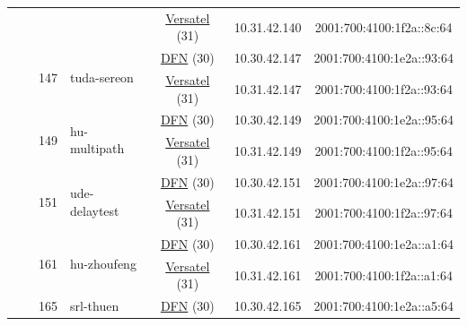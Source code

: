 \begin{small}
\begin{center}
\begin{longtable}{|c|c|c|c|c|c|c|c|}
  &  &  &  & \multicolumn{2}{|c|}{\tiny{\href{http://www.versatel.de}{Versatel} (31)}} & \tiny{10.31.42.140} & \tiny{2001:700:4100:1f2a::8c:64} \\* \cline{3-3}\cline{4-4}\cline{5-5}\cline{6-6}\cline{7-7}\cline{8-8}
  &  & \multirow{2}{*}{\tiny{147}} & \multicolumn{1}{|l|}{\multirow{2}{*}{\tiny{tuda-sereon}}} & \multicolumn{2}{|c|}{\tiny{\href{https://www.dfn.de}{DFN} (30)}} & \tiny{10.30.42.147} & \tiny{2001:700:4100:1e2a::93:64} \\* \cline{5-5}\cline{6-6}\cline{7-7}\cline{8-8}
  &  &  &  & \multicolumn{2}{|c|}{\tiny{\href{http://www.versatel.de}{Versatel} (31)}} & \tiny{10.31.42.147} & \tiny{2001:700:4100:1f2a::93:64} \\* \cline{3-3}\cline{4-4}\cline{5-5}\cline{6-6}\cline{7-7}\cline{8-8}
  &  & \multirow{2}{*}{\tiny{149}} & \multicolumn{1}{|l|}{\multirow{2}{*}{\tiny{hu-multipath}}} & \multicolumn{2}{|c|}{\tiny{\href{https://www.dfn.de}{DFN} (30)}} & \tiny{10.30.42.149} & \tiny{2001:700:4100:1e2a::95:64} \\* \cline{5-5}\cline{6-6}\cline{7-7}\cline{8-8}
  &  &  &  & \multicolumn{2}{|c|}{\tiny{\href{http://www.versatel.de}{Versatel} (31)}} & \tiny{10.31.42.149} & \tiny{2001:700:4100:1f2a::95:64} \\* \cline{3-3}\cline{4-4}\cline{5-5}\cline{6-6}\cline{7-7}\cline{8-8}
  &  & \multirow{2}{*}{\tiny{151}} & \multicolumn{1}{|l|}{\multirow{2}{*}{\tiny{ude-delaytest}}} & \multicolumn{2}{|c|}{\tiny{\href{https://www.dfn.de}{DFN} (30)}} & \tiny{10.30.42.151} & \tiny{2001:700:4100:1e2a::97:64} \\* \cline{5-5}\cline{6-6}\cline{7-7}\cline{8-8}
  &  &  &  & \multicolumn{2}{|c|}{\tiny{\href{http://www.versatel.de}{Versatel} (31)}} & \tiny{10.31.42.151} & \tiny{2001:700:4100:1f2a::97:64} \\* \cline{3-3}\cline{4-4}\cline{5-5}\cline{6-6}\cline{7-7}\cline{8-8}
  &  & \multirow{2}{*}{\tiny{161}} & \multicolumn{1}{|l|}{\multirow{2}{*}{\tiny{hu-zhoufeng}}} & \multicolumn{2}{|c|}{\tiny{\href{https://www.dfn.de}{DFN} (30)}} & \tiny{10.30.42.161} & \tiny{2001:700:4100:1e2a::a1:64} \\* \cline{5-5}\cline{6-6}\cline{7-7}\cline{8-8}
  &  &  &  & \multicolumn{2}{|c|}{\tiny{\href{http://www.versatel.de}{Versatel} (31)}} & \tiny{10.31.42.161} & \tiny{2001:700:4100:1f2a::a1:64} \\* \cline{3-3}\cline{4-4}\cline{5-5}\cline{6-6}\cline{7-7}\cline{8-8}
  &  & \multirow{2}{*}{\tiny{165}} & \multicolumn{1}{|l|}{\multirow{2}{*}{\tiny{srl-thuen}}} & \multicolumn{2}{|c|}{\tiny{\href{https://www.dfn.de}{DFN} (30)}} & \tiny{10.30.42.165} & \tiny{2001:700:4100:1e2a::a5:64} \\* \cline{5-5}\cline{6-6}\cline{7-7}\cline{8-8}

\end{longtable}
\end{center}
\end{small}
